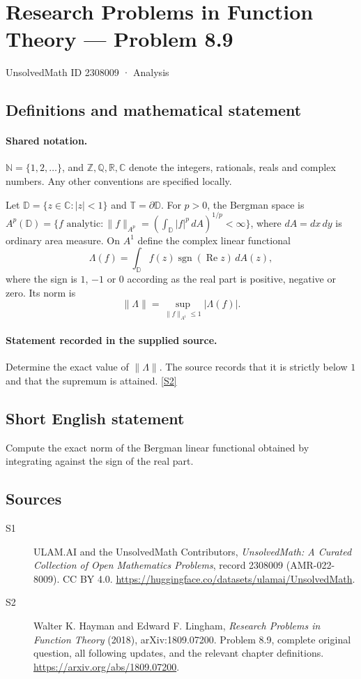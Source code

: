 \documentclass[11pt]{book}
\newcommand{\sref}[2]{\hyperlink{source:#1:#2}{[S#2]}}
\begin{document}
\setcounter{section}{2308008}
\section{Research Problems in Function Theory — Problem 8.9}\label{2308009}
{\small\sffamily UnsolvedMath ID 2308009 · Analysis}
\subsection{Definitions and mathematical statement}

\paragraph{Shared notation.}$\mathbb N=\{1,2,\ldots\}$, and $\mathbb Z,\mathbb Q,\mathbb R,\mathbb C$ denote the integers, rationals, reals and complex numbers. Any other conventions are specified locally.


Let $\mathbb D=\{z\in\mathbb C:|z|<1\}$ and $\mathbb T=\partial\mathbb D$. For $p>0$, the Bergman space is $A^p(\mathbb D)=\{f\text{ analytic}:\|f\|_{A^p}=(\int_{\mathbb D}|f|^p\,dA)^{1/p}<\infty\}$, where $dA=dx\,dy$ is ordinary area measure. On $A^1$ define the complex linear functional \[\Lambda(f)=\int_{\mathbb D}f(z)\operatorname{sgn}(\operatorname{Re}z)\,dA(z),\] where the sign is $1$, $-1$ or $0$ according as the real part is positive, negative or zero. Its norm is \[\|\Lambda\|=\sup_{\|f\|_{A^1}\le1}|\Lambda(f)|.\]
\paragraph{Statement recorded in the supplied source.}
Determine the exact value of $\|\Lambda\|$. The source records that it is strictly below $1$ and that the supremum is attained. \sref{2308009}{2}
\subsection{Short English statement}
Compute the exact norm of the Bergman linear functional obtained by integrating against the sign of the real part.
\subsection{Sources}
\begin{description}
\item[\hypertarget{source:2308009:1}{S1}] ULAM.AI and the UnsolvedMath Contributors, \emph{UnsolvedMath: A Curated Collection of Open Mathematics Problems}, record 2308009 (AMR-022-8009). CC BY 4.0. \url{https://huggingface.co/datasets/ulamai/UnsolvedMath}.
\item[\hypertarget{source:2308009:2}{S2}] Walter K. Hayman and Edward F. Lingham, \emph{Research Problems in Function Theory} (2018), arXiv:1809.07200. Problem 8.9, complete original question, all following updates, and the relevant chapter definitions. \url{https://arxiv.org/abs/1809.07200}.
\end{description}
\label{end:2308009}
\end{document}
